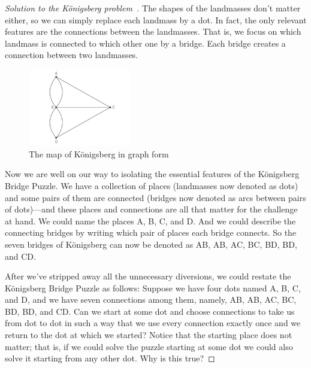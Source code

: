 \begin{proof}[Solution to the K\"onigsberg problem~\cite{Burger2013}]
   The shapes of the landmasses don't matter either, so we can simply replace each landmass by a dot. In fact, the only relevant features are the connections between the landmasses. That is, we focus on which landmass is connected to which other one by a bridge. Each bridge creates a connection between two landmasses.




\begin{figure}[h]
\centering
\includegraphics[width=0.4\textwidth]{Figures/Konigsberg-graph}
\caption{ The map of K\"onigsberg in graph form } 
\label{fig:konigsberg-graph}
\end{figure}

Now we are well on our way to isolating the essential features of the Königsberg Bridge Puzzle. We have a collection of places (landmasses now denoted as dots) and some pairs of them are connected (bridges now denoted as arcs between pairs of dots)—and these places and connections are all that matter for the challenge at hand. We could name the places A, B, C, and D. And we could describe the connecting bridges by writing which pair of places each bridge connects. So the seven bridges of Königsberg can now be denoted as AB, AB, AC, BC, BD, BD, and CD.





After we've stripped away all the unnecessary diversions, we could restate the Königsberg Bridge Puzzle as follows: Suppose we have four dots named A, B, C, and D, and we have seven connections among them, namely, AB, AB, AC, BC, BD, BD, and CD. Can we start at some dot and choose connections to take us from dot to dot in such a way that we use every connection exactly once and we return to the dot at which we started? Notice that the starting place does not matter; that is, if we could solve the puzzle starting at some dot we could also solve it starting from any other dot. Why is this true?


\end{proof}
